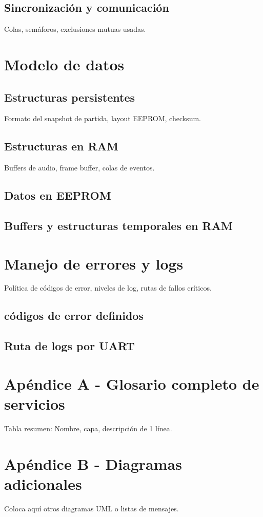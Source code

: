 \documentclass[11pt,a4paper]{article}
\begin{document}
\subsection{Sincronización y comunicación}
Colas, semáforos, exclusiones mutuas usadas.


\section{Modelo de datos}
\subsection{Estructuras persistentes}
Formato del snapshot de partida, layout EEPROM, checksum.

\subsection{Estructuras en RAM}
Buffers de audio, frame buffer, colas de eventos.
\subsection{Datos en EEPROM}
\subsection{Buffers y estructuras temporales en RAM}

\section{Manejo de errores y logs}
Política de códigos de error, niveles de log, rutas de fallos críticos.

\subsection{códigos de error definidos}
\subsection{Ruta de logs por UART}



\appendix
\section{Apéndice A - Glosario completo de servicios}
Tabla resumen: Nombre, capa, descripción de 1 línea.

\section{Apéndice B - Diagramas adicionales}
Coloca aquí otros diagramas UML o listas de mensajes.
\end{document}
